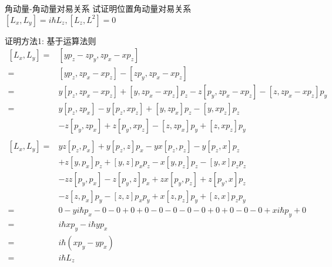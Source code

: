 \begin{frame} [allowframebreaks=]
    \frametitle{}
    \begin{tcolorbox1}{角动量-角动量对易关系}
        试证明位置角动量对易关系 $[L_x,L_y]=i\hbar L_z,  [L_z, L^2]= 0$
    \end{tcolorbox1}
    \alert{证明方法1:} 基于运算法则 
    \begin{equation*}
        \begin{split}
        [L_x,L_y]= &[yp_z-zp_y,zp_x-xp_z]\\
        =&[yp_z,zp_x-xp_z] - [zp_y,zp_x-xp_z]\\
        =&y[p_z,zp_x-xp_z]+[y,zp_x-xp_z]p_z- z[p_y,zp_x-xp_z]-[z,zp_x-xp_z]p_y\\
        =&y[p_z,zp_x]-y[p_z,xp_z]+[y,zp_x]p_z-[y,xp_z]p_z \\ &-z[p_y,zp_x] +z[p_y,xp_z]- [z,zp_x]p_y+[z,xp_z]p_y\\    
    \end{split}  
    \end{equation*}
    \begin{equation*}
        \begin{split}
        [L_x,L_y]=&yz[p_z,p_x]+y[p_z,z]p_x-yx[p_z,p_z]-y[p_z,x]p_z \\ & +z[y,p_x]p_z+[y,z]p_xp_z-x[y,p_z]p_z -[y,x]p_zp_z \\ & -zz[p_y,p_x] -z[p_y,z]p_x +zx[p_y,p_z] +z[p_y,x]p_z \\ & -z[z,p_x]p_y -[z,z]p_xp_y+x[z,p_z]p_y +[z,x]p_zp_y\\  
        =&0-yi\hbar p_x-0-0+0+0-0 -0-0 -0 +0 +0-0 -0+xi\hbar p_y +0\\
        =&i\hbar xp_y-i\hbar y p_x\\
        =&i\hbar (xp_y-y p_x)\\
        =&i\hbar L_z\\    
    \end{split}  
    \end{equation*}
\end{frame} 

